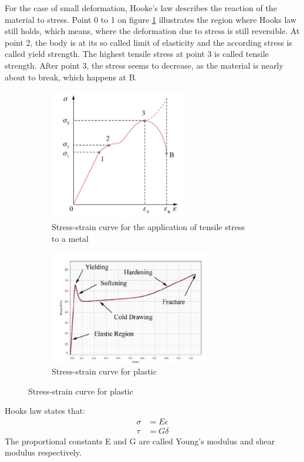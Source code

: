 \documentclass{scrartcl}
\begin{document}
For the case of small deformation, Hooke's law describes the reaction of the material to stress. Point 0 to 1 on figure \ref{fig:Hook} illustrates the region where Hooks law still holds, which means, where the deformation due to stress is still reversible. At  point  2, the body is at its so called limit of elasticity and the according stress is called yield strength. The highest tensile stress at point 3 is called tensile strength. After point 3, the stress seems to decrease, as the material is nearly about to break, which happens at B.
\begin{figure}[h]
\begin{subfigure}{0.5 \textwidth}
\includegraphics[width=6cm]{Theory and Setup/Screenshot 2022-04-03 121455.png}
\caption{Stress-strain curve for the application of tensile stress to a metal}
\label{fig:Hook}
\end{subfigure}
\begin{subfigure}{0.5 \textwidth}
\includegraphics[width=7cm]{Theory and Setup/Screenshot 2022-04-03 123306.png}
\caption{Stress-strain curve for plastic}
\label{fig:polymers}
\end{subfigure}
\end{figure}


Hooks law states that: 
\begin{align}
    \sigma &= E\epsilon \\
     \tau &= G\delta
\end{align}
The proportional constants E and G are called Young's modulus and shear modulus respectively.
\end{document}
